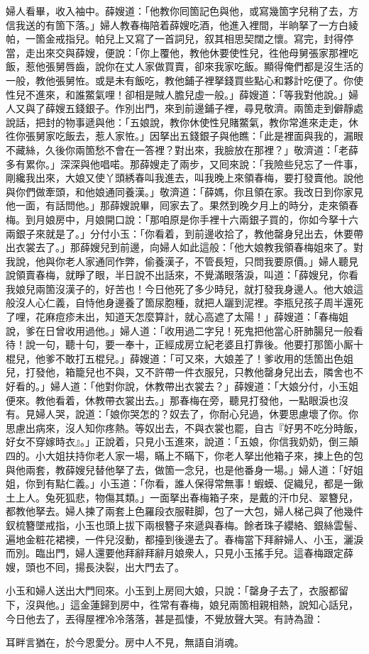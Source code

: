 婦人看畢，收入袖中。薛嫂道：「他教你囘箇記色與他，或寫幾箇字兒稍了去，方信我送的有箇下落。」婦人教春梅陪着薛嫂吃酒，他進入裡間，半晌拏了一方白綾帕，一箇金戒指兒。帕兒上又寫了一首詞兒，叙其相思契闊之懷。寫完，封得停當，走出來交與薛嫂，便說：「你上覆他，教他休要使性兒，徃他母舅張家那裡吃飯，惹他張舅唇齒，說你在丈人家做買賣，卻來我家吃飯。顯得俺們都是沒生活的一般，教他張舅恠。或是未有飯吃，教他鋪子裡拏錢買些點心和夥計吃便了。你使性兒不進來，和誰鱉氣哩！卻相是賊人膽兒虛一般。」薛嫂道：「等我對他說。」婦人又與了薛嫂五錢銀子。作別出門，來到前邊鋪子裡，尋見敬濟。兩箇走到僻靜處說話，把封的物事遞與他：「五娘說，教你休使性兒賭鱉氣，教你常進來走走，休徃你張舅家吃飯去，惹人家恠。」因拏出五錢銀子與他瞧：「此是裡面與我的，漏眼不藏絲，久後你兩箇愁不會在一答裡？對出來，我臉放在那裡？」敬濟道：「老薛多有累你。」深深與他唱喏。那薛嫂走了兩步，又囘來說：「我險些兒忘了一件事，剛纔我出來，大娘又使丫頭綉春叫我進去，叫我晚上來領春梅，要打發賣他。說他與你們做牽頭，和他娘通同養漢。」敬濟道：「薛媽，你且領在家。我改日到你家見他一面，有話問他。」那薛嫂說畢，囘家去了。果然到晚夕月上的時分，走來領春梅。到月娘房中，月娘開口說：「那咱原是你手裡十六兩銀子買的，你如今拏十六兩銀子來就是了。」分付小玉：「你看着，到前邊收拾了，教他罄身兒出去，休要帶出衣裳去了。」那薛嫂兒到前邊，向婦人如此這般：「他大娘教我領春梅姐來了。對我說，他與你老人家通同作弊，偷養漢子，不管長短，只問我要原價。」婦人聽見說領賣春梅，就睜了眼，半日說不出話來，不覺滿眼落淚，叫道：「薛嫂兒，你看我娘兒兩箇沒漢子的，好苦也！{}今日他死了多少時兒，就打發我身邊人。他大娘這般沒人心仁義，自恃他身邊養了箇尿胞種，就把人躧到泥裡。李瓶兒孩子周半還死了哩，花麻痘疹未出，知道天怎麼算計，就心高遮了太陽！」薛嫂道：「春梅姐說，爹在日曾收用過他。」婦人道：「收用過二字兒！死鬼把他當心肝肺腸兒一般看待！說一句，聽十句，要一奉十，正經成房立紀老婆且打靠後。他要打那箇小厮十棍兒，他爹不敢打五棍兒。」薛嫂道：「可又來，大娘差了！爹收用的恁箇出色姐兒，打發他，箱籠兒也不與，又不許帶一件衣服兒，只教他罄身兒出去，隣舍也不好看的。」{}婦人道：「他對你說，休教帶出衣裳去？」薛嫂道：「大娘分付，小玉姐便來。教他看着，休教帶衣裳出去。」那春梅在旁，聽見打發他，一點眼淚也沒有。見婦人哭，說道：「娘你哭怎的？奴去了，你耐心兒過，休要思慮壞了你。你思慮出病來，沒人知你疼熱。等奴出去，不與衣裳也罷，自古『好男不吃分時飯，好女不穿嫁時衣』。」{}正說着，只見小玉進來，說道：「五娘，你信我奶奶，倒三顛四的。小大姐扶持你老人家一場，瞞上不瞞下，你老人拏出他箱子來，揀上色的包與他兩套，教薛嫂兒替他拏了去，做箇一念兒，也是他番身一場。」婦人道：「好姐姐，你到有點仁義。」小玉道：「你看，誰人保得常無事！蝦蟆、促織兒，都是一鍬土上人。兔死狐悲，物傷其類。」一面拏出春梅箱子來，是戴的汗巾兒、翠簪兒，都教他拏去。婦人揀了兩套上色羅段衣服鞋脚，包了一大包，婦人梯己與了他幾件釵梳簪墜戒指，小玉也頭上拔下兩根簪子來遞與春梅。餘者珠子纓絡、銀絲雲髻、遍地金粧花裙襖，一件兒沒動，都擡到後邊去了。春梅當下拜辭婦人、小玉，灑淚而別。臨出門，婦人還要他拜辭拜辭月娘衆人，{}只見小玉搖手兒。這春梅跟定薛嫂，頭也不囘，揚長決裂，出大門去了。{}

小玉和婦人送出大門囘來。小玉到上房囘大娘，只說：「罄身子去了，衣服都留下，沒與他。」這金蓮歸到房中，徃常有春梅，娘兒兩箇相親相熱，說知心話兒，今日他去了，丟得屋裡冷冷落落，甚是孤悽，不覺放聲大哭。有詩為證：

耳畔言猶在，於今恩愛分。房中人不見，無語自消魂。

